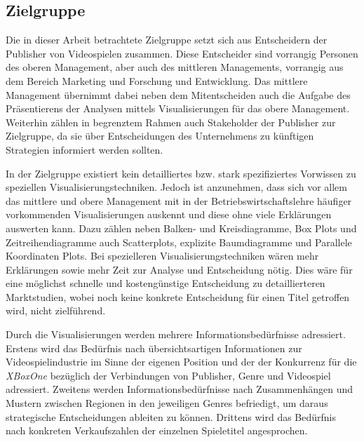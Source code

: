 \documentclass[usegeometry=true]{scrartcl}
\begin{document}
\subsection{Zielgruppe}
Die in dieser Arbeit betrachtete Zielgruppe setzt sich aus Entscheidern der Publisher von Videospielen zusammen. 
Diese Entscheider sind vorrangig Personen des oberen Management, aber auch des mittleren Managements, vorrangig aus dem Bereich Marketing und Forschung und Entwicklung. 
Das mittlere Management übernimmt dabei neben dem Mitentscheiden auch die Aufgabe des Präsentierens der Analysen mittels Visualisierungen für das obere Management.
Weiterhin zählen in begrenztem Rahmen auch Stakeholder der Publisher zur Zielgruppe, da sie über Entscheidungen des Unternehmens zu künftigen Strategien informiert werden sollten. 

In der Zielgruppe existiert kein detailliertes bzw. stark spezifiziertes Vorwissen zu speziellen Visualisierungstechniken. 
Jedoch ist anzunehmen, dass sich vor allem das mittlere und obere Management mit in der Betriebswirtschaftslehre häufiger vorkommenden Visualisierungen auskennt und diese ohne viele Erklärungen auswerten kann.
Dazu zählen neben Balken- und Kreisdiagramme, Box Plots und Zeitreihendiagramme auch Scatterplots, explizite Baumdiagramme und Parallele Koordinaten Plots. 
Bei spezielleren Visualisierungstechniken wären mehr Erklärungen sowie mehr Zeit zur Analyse und Entscheidung nötig. 
Dies wäre für eine möglichst schnelle und kostengünstige Entscheidung zu detaillierteren Marktstudien, wobei noch keine konkrete Entscheidung für einen Titel getroffen wird, nicht zielführend.

Durch die Visualisierungen werden mehrere Informationsbedürfnisse adressiert. 
Erstens wird das Bedürfnis nach übersichtsartigen Informationen zur Videospielindustrie im Sinne der eigenen Position und der der Konkurrenz für die \textit{XBoxOne} bezüglich der Verbindungen von Publisher, Genre und Videospiel adressiert.
Zweitens werden Informationsbedürfnisse nach Zusammenhängen und Mustern zwischen Regionen in den jeweiligen Genres befriedigt, um daraus strategische Entscheidungen ableiten zu können.
Drittens wird das Bedürfnis nach konkreten Verkaufszahlen der einzelnen Spieletitel angesprochen.
\end{document}
